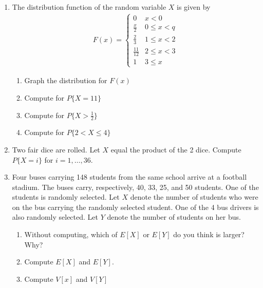 \documentclass{article}
\begin{document}
\begin{enumerate}
    \item The distribution function of the random variable $X$ is given by \begin{align}
    F(x) = \begin{cases} 
    	0 & x < 0 \\
    	\frac{x}{2} & 0 \leq x < q \\
    	\frac{2}{3} & 1 \leq x < 2 \\
    	\frac{11}{12} & 2 \leq x < 3 \\
    	1 & 3 \leq x
    \end{cases}
    \end{align}
    \begin{enumerate}
        \item Graph the distribution for $F(x)$
        \item Compute for $P\{X = 11\}$
        \item Compute for $P\{X > \frac{1}{2}\}$
        \item Compute for $P\{2 < X \leq 4 \}$
    \end{enumerate}
    
    \item Two fair dice are rolled. Let $X$ equal the product of the 2 dice. Compute $P\{X = i\}$ for $i = 1, \dots , 36$.
    \item Four buses carrying 148 students from the same school arrive at a football stadium. The buses carry, respectively, 40, 33, 25, and 50 students. One of the students is randomly selected. Let $X$ denote the number of students who were on the bus carrying the randomly selected student. One of the 4 bus drivers is also randomly selected. Let $Y$ denote the number of students on her bus.
    \begin{enumerate}
        \item Without computing, which of $E[X]$ or $E[Y]$ do you think is larger? Why?
        \item Compute $E[X]$ and $E[Y]$.
        \item Compute $V[x]$ and $V[Y]$
    \end{enumerate}


\end{enumerate}
\end{document}
